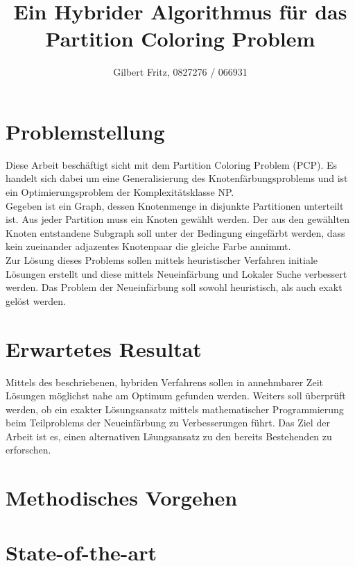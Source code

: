 

\title{Ein Hybrider Algorithmus für das Partition Coloring Problem}
\author{Gilbert Fritz, 0827276 / 066931}



\maketitle
\nocite{li-00}

\section{Problemstellung}

Diese Arbeit besch\"aftigt sicht mit dem Partition Coloring Problem (PCP). Es handelt sich dabei um eine Generalisierung des Knotenf\"arbungsproblems und ist ein Optimierungsproblem der Komplexit\"atsklasse NP.\\
Gegeben ist ein Graph, dessen Knotenmenge in disjunkte Partitionen unterteilt ist. Aus jeder Partition muss ein Knoten gew\"ahlt werden. Der aus den gew\"ahlten Knoten entstandene Subgraph soll unter der Bedingung eingef\"arbt werden, dass kein zueinander adjazentes Knotenpaar die gleiche Farbe annimmt.\\
Zur L\"osung dieses Problems sollen mittels heuristischer Verfahren initiale L\"osungen erstellt und diese mittels Neueinf\"arbung und Lokaler Suche verbessert werden. Das Problem der Neueinf\"arbung soll sowohl heuristisch, als auch exakt gel\"ost werden.

\section{Erwartetes Resultat}

Mittels des beschriebenen, hybriden Verfahrens sollen in annehmbarer Zeit L\"osungen m\"oglichst nahe am Optimum gefunden werden. Weiters soll \"uberpr\"uft werden, ob ein exakter L\"osungsansatz mittels mathematischer Programmierung beim Teilproblems der Neueinf\"arbung zu Verbesserungen führt. Das Ziel der Arbeit ist es, einen alternativen L\"sungsansatz zu den bereits Bestehenden zu erforschen.


\section{Methodisches Vorgehen}




\section{State-of-the-art}

